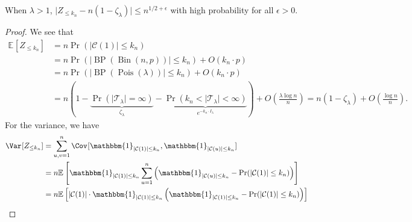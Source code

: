 \begin{lemma}\label{lma:small-component-supercritical-Erdős-Rényi-graph}
	When \(\lambda > 1\), \(\lvert Z_{\leq k_n} - n(1 - \zeta _\lambda ) \rvert \leq n^{1 / 2 + \epsilon }\) with high probability for all \(\epsilon > 0\).
\end{lemma}
\begin{proof}
	We see that
	\[
		\begin{split}
			\mathbb{E}_{}[Z_{\leq k_n}]
			 & = n \Pr_{}(\lvert \mathcal{C} (1) \rvert \leq k_n)                                                                                                                                                                                                  \\
			 & = n \Pr_{}(\lvert \operatorname{BP}(\operatorname{Bin}(n, p) )  \rvert \leq k_n) + O(k_n \cdot p)                                                                                                                                                   \\
			 & = n \Pr_{}(\lvert \operatorname{BP}(\operatorname{Pois}(\lambda ) )  \rvert \leq k_n) + O(k_n \cdot p)                                                                                                                                              \\
			 & = n ( 1 - \underbrace{\Pr_{}(\lvert \mathcal{T} _\lambda  \rvert = \infty )}_{\zeta _\lambda }  - \underbrace{\Pr_{}(k_n < \lvert \mathcal{T} _\lambda \rvert < \infty )}_{e^{-k_n \cdot I _\lambda }} ) + O\left( \frac{\lambda \log n}{n} \right)
			= n (1 - \zeta _\lambda ) + O\left( \frac{\log n}{n} \right).
		\end{split}
	\]
	For the variance, we have
	\[
		\begin{split}
			\Var_{}[Z_{\leq k_n}]
			 & = \sum_{u, v=1}^{n} \Cov_{}[\mathbbm{1}_{\lvert \mathcal{C} (1) \rvert \leq k_n} , \mathbbm{1}_{\lvert \mathcal{C} (u) \rvert \leq k_n} ]                                                                                                                     \\
			 & = n\mathbb{E}_{}\left[\mathbbm{1}_{\lvert \mathcal{C} (1) \rvert \leq k_n} \sum_{u=1}^{n} \left( \mathbbm{1}_{\lvert \mathcal{C} (u) \rvert \leq k_n} - \Pr_{}(\lvert \mathcal{C} (1) \rvert \leq k_n)  \right)  \right]                                      \\
			 & = n\mathbb{E}_{}\left[\lvert \mathcal{C} (1) \rvert \cdot \mathbbm{1}_{\lvert \mathcal{C} (1) \rvert \leq k_n} \left( \mathbbm{1}_{\lvert \mathcal{C} (1) \rvert \leq k_n} - \Pr_{}(\lvert \mathcal{C} (1) \rvert \leq k_n) \right) \right]                   \\

\end{split}\]
\end{proof}

